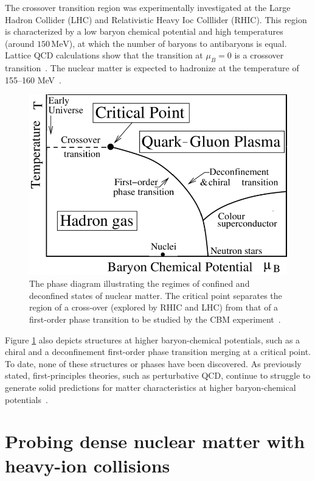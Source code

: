 The crossover transition region was experimentally investigated at the Large Hadron Collider (\gls{LHC}) and Relativistic Heavy Ioc Colllider (\gls{RHIC}). This region is characterized by a low baryon chemical potential and high temperatures (around $150\,\mathrm{MeV}$), at which the number of baryons to antibaryons is equal. Lattice \gls{QCD} calculations show that the transition at $\mu_{B} = 0$ is a crossover transition~\cite{Aoki_2006}. The nuclear matter is expected to hadronize at the temperature of 155--160 MeV~\cite{Bazavov_2012, Stachel_2014}.



\begin{figure}[!h]
\centering
 \includegraphics[width=0.65\columnwidth]{Chapter1/images/phase.png}
\caption{The phase diagram illustrating the regimes of confined and deconfined states of nuclear matter. The critical point separates the region of a cross-over (explored by \gls{RHIC} and \gls{LHC}) from that of a first-order phase transition to be studied by the CBM experiment~\cite{friese_diagram}.}
\label{fig_phase}
\end{figure}
Figure \ref{fig_phase} also depicts structures at higher baryon-chemical potentials, such as a chiral and a deconfinement first-order phase transition merging at a critical point. To date, none of these structures or phases have been discovered. As previously stated, first-principles theories, such as perturbative QCD, continue to struggle to generate solid predictions for matter characteristics at higher baryon-chemical potentials~\cite{Sakai_2008, Fischer_01, Tawfik_01}. 



\section{Probing dense nuclear matter with heavy-ion collisions}

